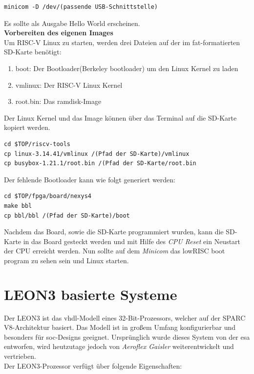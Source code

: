 \begin{lstlisting}[caption={Aufruf des \emph{Minicom}},label={code:minicom}]
minicom -D /dev/(passende USB-Schnittstelle)
\end{lstlisting}


Es sollte als Ausgabe Hello World erscheinen.\\

\textbf{Vorbereiten des eigenen Images}\\

Um RISC-V Linux zu starten, werden drei Dateien auf der im \ac{fat}-formatierten SD-Karte benötigt:
\begin{enumerate}
  \item boot: Der Bootloader(Berkeley bootloader) um den Linux Kernel zu laden
  \item vmlinux: Der RISC-V Linux Kernel
  \item root.bin: Das ramdisk-Image
\end{enumerate}

\vspace{5mm}
Der Linux Kernel und das Image können über das Terminal auf die SD-Karte kopiert werden.

\begin{lstlisting}
cd $TOP/riscv-tools
cp linux-3.14.41/vmlinux /(Pfad der SD-Karte)/vmlinux
cp busybox-1.21.1/root.bin /(Pfad der SD-Karte/root.bin
\end{lstlisting}


Der fehlende Bootloader kann wie folgt generiert werden:\\

\begin{lstlisting}
cd $TOP/fpga/board/nexys4
make bbl
cp bbl/bbl /(Pfad der SD-Karte)/boot
\end{lstlisting}

Nachdem das Board, sowie die SD-Karte programmiert wurden, kann die SD-Karte in das Board gesteckt werden und mit Hilfe des \emph{CPU Reset} ein Neustart der CPU erreicht werden.
Nun sollte auf dem \emph{Minicom} das lowRISC boot program zu sehen sein und Linux starten.\\
\newpage

\section{LEON3 basierte Systeme}\label{kap:leon3}

Der LEON3 ist das \ac{vhdl}-Modell eines 32-Bit-Prozessors, welcher auf der SPARC V8-Architektur basiert. Das Modell ist in großem Umfang konfigurierbar und besonders für \ac{soc}-Designs geeignet.
Ursprünglich wurde dieses System von der \ac{esa} entworfen, wird heutzutage jedoch von \emph{Aeroflex Gaisler} weiterentwickelt und vertrieben.\\
Der LEON3-Prozessor verfügt über folgende Eigenschaften:\cite{leon}\\

